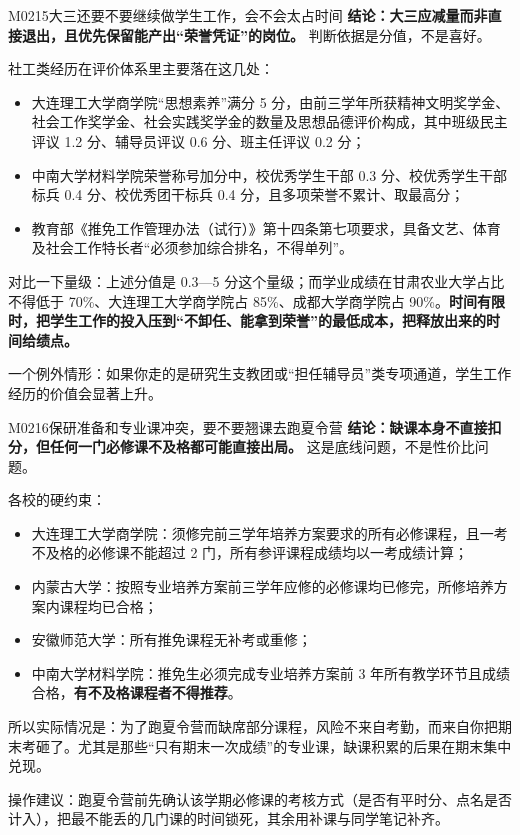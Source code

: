 \begin{qa}{M0215}{大三还要不要继续做学生工作，会不会太占时间}
\textbf{结论：大三应减量而非直接退出，且优先保留能产出“荣誉凭证”的岗位。} 判断依据是分值，不是喜好。

社工类经历在评价体系里主要落在这几处：
\begin{itemize}
  \item 大连理工大学商学院“思想素养”满分 5 分，由前三学年所获精神文明奖学金、社会工作奖学金、社会实践奖学金的数量及思想品德评价构成，其中班级民主评议 1.2 分、辅导员评议 0.6 分、班主任评议 0.2 分；
  \item 中南大学材料学院荣誉称号加分中，校优秀学生干部 0.3 分、校优秀学生干部标兵 0.4 分、校优秀团干标兵 0.4 分，且多项荣誉不累计、取最高分；
  \item 教育部《推免工作管理办法（试行）》第十四条第七项要求，具备文艺、体育及社会工作特长者“必须参加综合排名，不得单列”。
\end{itemize}

对比一下量级：上述分值是 0.3—5 分这个量级；而学业成绩在甘肃农业大学占比不得低于 70\%、大连理工大学商学院占 85\%、成都大学商学院占 90\%。\textbf{时间有限时，把学生工作的投入压到“不卸任、能拿到荣誉”的最低成本，把释放出来的时间给绩点。}

一个例外情形：如果你走的是研究生支教团或“担任辅导员”类专项通道，学生工作经历的价值会显著上升。
\end{qa}

\begin{qa}{M0216}{保研准备和专业课冲突，要不要翘课去跑夏令营}
\textbf{结论：缺课本身不直接扣分，但任何一门必修课不及格都可能直接出局。} 这是底线问题，不是性价比问题。

各校的硬约束：
\begin{itemize}
  \item 大连理工大学商学院：须修完前三学年培养方案要求的所有必修课程，且一考不及格的必修课不能超过 2 门，所有参评课程成绩均以一考成绩计算；
  \item 内蒙古大学：按照专业培养方案前三学年应修的必修课均已修完，所修培养方案内课程均已合格；
  \item 安徽师范大学：所有推免课程无补考或重修；
  \item 中南大学材料学院：推免生必须完成专业培养方案前 3 年所有教学环节且成绩合格，\textbf{有不及格课程者不得推荐}。
\end{itemize}

所以实际情况是：为了跑夏令营而缺席部分课程，风险不来自考勤，而来自你把期末考砸了。尤其是那些“只有期末一次成绩”的专业课，缺课积累的后果在期末集中兑现。

操作建议：跑夏令营前先确认该学期必修课的考核方式（是否有平时分、点名是否计入），把最不能丢的几门课的时间锁死，其余用补课与同学笔记补齐。
\end{qa}

